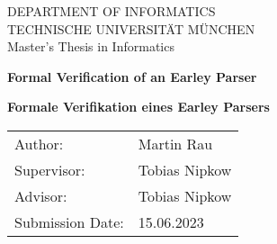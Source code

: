 \documentclass[headsepline,footsepline,footinclude=false,oneside,fontsize=11pt,paper=a4,listof=totoc,bibliography=totoc]{scrbook} %
\newcommand*{\getUniversity}{Technische Universität München}
\newcommand*{\getFaculty}{Department of Informatics}
\newcommand*{\getTitle}{Formal Verification of an Earley Parser}
\newcommand*{\getTitleGer}{Formale Verifikation eines Earley Parsers}
\newcommand*{\getAuthor}{Martin Rau}
\newcommand*{\getDoctype}{Master's Thesis in Informatics}
\newcommand*{\getSupervisor}{Tobias Nipkow}
\newcommand*{\getAdvisor}{Tobias Nipkow}
\newcommand*{\getSubmissionDate}{15.06.2023}
\begin{document}

\begin{titlepage}
  \centering


  \vspace{5mm}
  {\huge\MakeUppercase{\getFaculty{}}}\\

  \vspace{5mm}
  {\large\MakeUppercase{\getUniversity{}}}\\

  \vspace{20mm}
  {\Large \getDoctype{}}

  \vspace{15mm}
  {\huge\bfseries \getTitle{} \par}

  \vspace{10mm}
  {\huge\bfseries \foreignlanguage{ngerman}{\getTitleGer{}} \par}

  \vspace{15mm}
  \begin{tabular}{l l}
    Author:          & \getAuthor{} \\
    Supervisor:      & \getSupervisor{} \\
    Advisor:         & \getAdvisor{} \\
    Submission Date: & \getSubmissionDate{} \\
  \end{tabular}

\end{titlepage}

\end{document}
